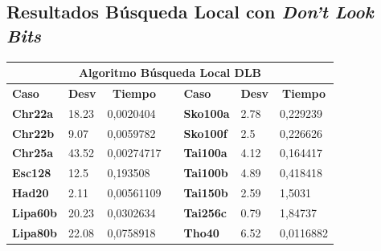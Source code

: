 \documentclass[a4paper, 12pt]{article}
\begin{document}
      
      \newpage
      \subsection{Resultados Búsqueda Local con \textit{Don't Look Bits}}
\begin{table}[H]
\centering
\label{my-label}
\begin{tabular}{|l|l|l|l|l|l|l|}
\hline
\multicolumn{7}{|c|}{\textbf{Algoritmo Búsqueda Local DLB}}                                                                                                                                    \\ \hline
\textbf{Caso}    & \multicolumn{1}{c|}{\textbf{Desv}} & \multicolumn{1}{c|}{\textbf{Tiempo}} &  & \textbf{Caso}    & \multicolumn{1}{c|}{\textbf{Desv}} & \multicolumn{1}{c|}{\textbf{Tiempo}} \\ \cline{1-3} \cline{5-7} 
\textbf{Chr22a}  & 18.23                              & 0,0020404                            &  & \textbf{Sko100a} & 2.78                               & 0,229239                             \\ \cline{1-3} \cline{5-7} 
\textbf{Chr22b}  & 9.07                               & 0,0059782                            &  & \textbf{Sko100f} & 2.5                                & 0,226626                             \\ \cline{1-3} \cline{5-7} 
\textbf{Chr25a}  & 43.52                              & 0,00274717                           &  & \textbf{Tai100a} & 4.12                               & 0,164417                             \\ \cline{1-3} \cline{5-7} 
\textbf{Esc128}  & 12.5                               & 0,193508                             &  & \textbf{Tai100b} & 4.89                               & 0,418418                             \\ \cline{1-3} \cline{5-7} 
\textbf{Had20}   & 2.11                               & 0,00561109                           &  & \textbf{Tai150b} & 2.59                               & 1,5031                               \\ \cline{1-3} \cline{5-7} 
\textbf{Lipa60b} & 20.23                              & 0,0302634                            &  & \textbf{Tai256c} & 0.79                               & 1,84737                              \\ \cline{1-3} \cline{5-7} 
\textbf{Lipa80b} & 22.08                              & 0,0758918                            &  & \textbf{Tho40}   & 6.52                               & 0,0116882                            \\ \cline{1-3} \cline{5-7} 

\end{tabular}
\end{table}
\end{document}
